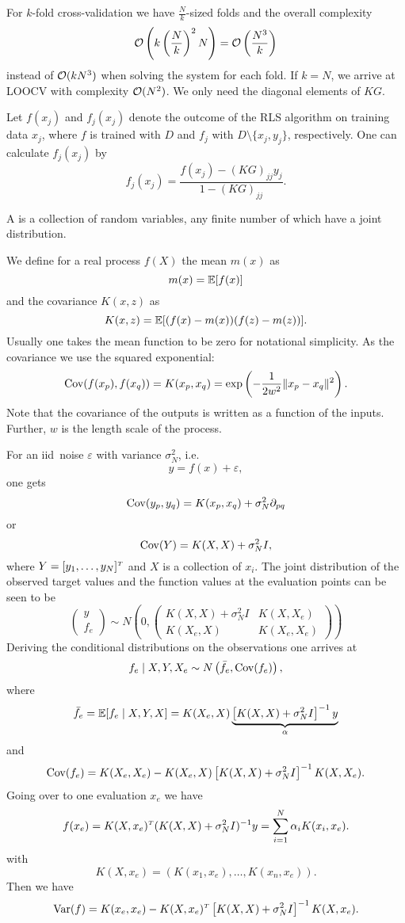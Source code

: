 \documentclass[../lecture-notes.tex]{subfiles}
\begin{document}
For $k$-fold cross-validation we have $\frac{N}{k}$-sized folds and the overall complexity
\[
	\mathcal{O} \left( k \left( \frac{N}{k} \right)^2 N \right) = \mathcal{O} \left( \frac{N^3}{k} \right)
\]
instead of $\mathcal{O}(k N^3)$ when solving the system for each fold.
If $k = N$, we arrive at \ac{LOOCV} with complexity $\mathcal{O}(N^2)$.
We only need the diagonal elements of $KG$.
\begin{corollary} %
\label{thm:48}
Let $f(x_j)$ and $f_j(x_j)$ denote the outcome of the \ac{RLS} algorithm on training data $x_j$, where $f$ is trained with $D$ and $f_j$ with $D \setminus \{ x_j, y_j \}$, respectively.
One can calculate $f_j(x_j)$ by 
\[
	f_j(x_j) = \frac{f(x_j) - (KG)_{jj} y_j}{1 - (KG)_{jj}}.
\]
\end{corollary}
\begin{definition} %
\label{thm:49}
A  is a collection of random variables, any finite number of which have a joint distribution.
\end{definition}
We define for a real process $f(X)$ the mean $m(x)$ as
\[
	m(x) = \mathbb{E} [f(x)] 
\]
and the covariance $K(x, z)$ as
\[
	K(x, z) = \mathbb{E} [(f(x) - m(x))(f(z) - m(z))].
\]
Usually one takes the mean function to be zero for notational simplicity.
As the covariance we use the squared exponential:
\[
	\operatorname{Cov}(f(x_p), f(x_q)) = K(x_p, x_q) = \exp \left( - \frac{1}{2 w^2} \| x_p - x_q \|^2 \right).
\]
Note that the covariance of the outputs is written as a function of the inputs.
Further, $w$ is the length scale of the process.

For an \ac{iid}\ noise $\varepsilon$ with variance $\sigma_N^2$, i.e.
\[
	y = f(x) + \varepsilon,
\]
one gets
\[
	\operatorname{Cov} (y_p, y_q) = K(x_p, x_q) + \sigma_N^2 \partial_{pq}
\]
or
\[
	\operatorname{Cov}(Y) = K(X, X) + \sigma_N^2 I,
\]
where $Y = [y_1, \ldots, y_N]^\tp$ and $X$ is a collection of $x_i$.
The joint distribution of the observed target values and the function values at the evaluation points can be seen to be
\[
	\begin{pmatrix}
	y \\ f_e
	\end{pmatrix} \sim N \left( 0, \begin{pmatrix}
		K(X, X) + \sigma_N^2 I & K(X, X_e) \\
		K(X_e, X) & K(X_e, X_e)
	\end{pmatrix} \right)
\]
Deriving the conditional distributions on the observations one arrives at
\[
	f_e \mid X, Y, X_e \sim N\left(\bar{f}_e, \operatorname{Cov}(f_e) \right),
\]
where
\[
	\bar{f}_e = \mathbb{E} [f_e \mid X, Y, X ] = K(X_e, X)\underbrace{ \left[ K(X, X) + \sigma_N^2 I \right]^{-1} y}_{\alpha}
\]
and
\[
	\operatorname{Cov}(f_e) = K(X_e, X_e) - K(X_e, X) \left[ K(X, X) + \sigma_N^2 I \right]^{-1} K(X, X_e).
\]
Going over to one evaluation $x_e$ we have
\[
	f(x_e) = K(X, x_e)^\tp (K(X, X) + \sigma_N^2 I)^{-1} y = \sum_{i=1}^N \alpha_i K(x_i, x_e).
\]
with
\[
	K(X, x_e) = (K(x_1, x_e), \ldots, K(x_n, x_e)).
\]
Then we have
\[
	\Var(f) = K(x_e, x_e) - K(X, x_e)^\tp \left[ K(X, X) + \sigma_N^2 I \right]^{-1} K(X, x_e).
\]
\end{document}
